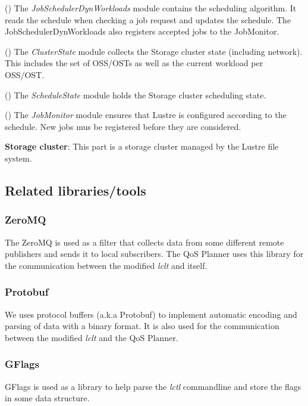 \documentclass[10pt]{article}
\begin{document}
(\textbf{{}}) The \emph{JobSchedulerDynWorkloads} module contains the scheduling algorithm. It reads the schedule when checking a job request and updates the schedule. The JobSchedulerDynWorkloads also registers accepted jobs to the JobMonitor.

(\textbf{{}}) The \emph{ClusterState} module collects the Storage cluster state (including network). This includes the set of OSS/OSTs as well as the current workload per OSS/OST.

(\textbf{{}}) The \emph{ScheduleState} module holds the Storage cluster scheduling state.

(\textbf{{}}) The \emph{JobMonitor} module ensures that Lustre is configured according to the schedule. New jobs mus be registered before they are considered.

\textbf{Storage cluster}: This part is a storage cluster managed by the Lustre file system.

%
\subsection{Related libraries/tools}
%
\subsubsection{ZeroMQ}
%
The ZeroMQ is used as a filter that collects data from some different remote publishers and sends it to local subscribers. The QoS Planner uses this library for the communication between the modified \emph{lclt} and itself.

\subsubsection{Protobuf}
We uses protocol buffers (a.k.a Protobuf) to implement automatic encoding and parsing of data with a binary format. It is also used for the communication between the modified \emph{lclt} and the QoS Planner.

\subsubsection{GFlags}
GFlags is used as a library to help parse the \emph{lctl} commandline and store the flags in some data structure.
\end{document}
